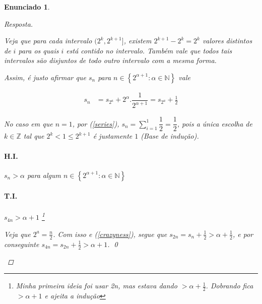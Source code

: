 \documentclass[a4paper,twoside,11pt]{article}
\newtheorem*{enunciado}{Enunciado}
\begin{document}
\begin{enunciado}
\begin{proof}[Resposta]
\begin{enumerate}[label=(\alph*)]
            

            Veja que para cada intervalo $(2^k, 2^{k+1}]$, existem
            $2^{k+1} - 2^k = 2^k$ valores distintos de $i$ para os quais $i$ está
            contido no intervalo. Também vale que todos tais intervalos são
            disjuntos de todo outro intervalo com a mesma forma.

            Assim, é justo afirmar que $s_n$ para $n \in \left\{2^{\alpha+1} : \alpha \in \mathbb{N}\right\}$
            vale

            \begin{equation}\label{crazyness}
                \begin{split}
                    s_n &= s_{2^a} + 2^\alpha . \dfrac{1}{2^{\alpha+1}}
                        = s_{2^a} + \frac{1}{2}
                \end{split}
            \end{equation}
            
            No caso em que $n = 1$, por (\ref{series}),
            $s_n = \sum^1_{i=1}\dfrac{1}{2} = \dfrac{1}{2}$,
            pois a única escolha de $k \in \mathbb{Z}$ tal que
            $2^k < 1 \leq 2^{k+1}$ é justamente $1$ (Base de indução).

            \paragraph{H.I.} $s_n > \alpha$ para algum $n \in \left\{2^{\alpha+1} : \alpha \in \mathbb{N}\right\}$
            \paragraph{T.I.} $s_{4n} > \alpha + 1$
            \footnote{
                Minha primeira ideia foi usar 2n,
                mas estava dando $>\alpha + \frac{1}{2}$.
                Dobrando fica $> \alpha + 1$ e ajeita a indução
            }

            Veja que $2^a = \frac{n}{2}$. Com isso e (\ref{crazyness}), segue
            que $s_{2n} = s_n + \frac{1}{2} > \alpha + \frac{1}{2}$, e por
            conseguinte $s_{4n} = s_{2n} + \frac{1}{2} > \alpha + 1$. \qed


\end{enumerate}
\end{proof}
\end{enunciado}
\end{document}
